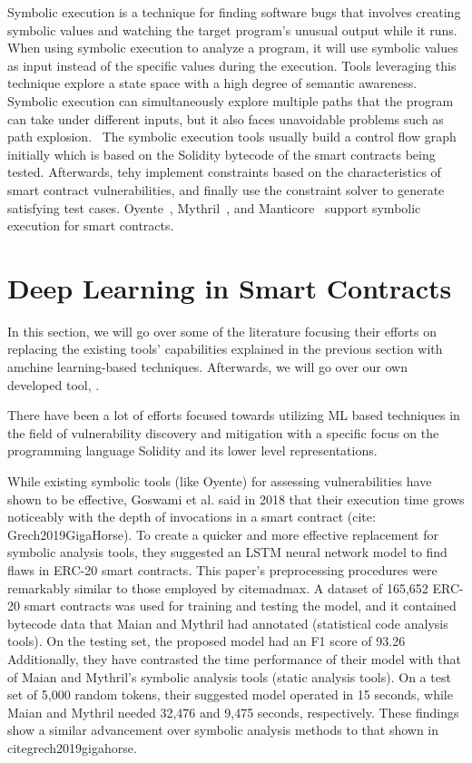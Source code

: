 Symbolic execution is a technique for finding software bugs that involves creating symbolic values and watching the target program's unusual output while it runs.
When using symbolic execution to analyze a program, it will use symbolic values as input instead of the specific values during the execution.
Tools leveraging this technique explore a state space with a high degree of semantic awareness.~\cite{boyer1975select}
Symbolic execution can simultaneously explore multiple paths that the program can take under different inputs, but it also faces unavoidable problems such as path explosion.~\cite{Empirical-Evaluation-of-Smart-Contract-Testing:What-is-the-Best-Choice}
The symbolic execution tools usually build a control flow graph initially which is based on the Solidity bytecode of the smart contracts being tested.
Afterwards, tehy implement constraints based on the characteristics of smart contract vulnerabilities, and finally use the constraint solver to generate satisfying test cases.
Oyente~\cite{oyente}, Mythril~\cite{mythril}, and Manticore~\cite{mossberg2019manticore} support symbolic execution for smart contracts.


\section{Deep Learning in Smart Contracts} \label{sec:dl-models}

In this section, we will go over some of the literature focusing their efforts on replacing the existing tools' capabilities explained in the previous section with amchine learning-based techniques.
Afterwards, we will go over our own developed tool, \slithersimil.

There have been a lot of efforts focused towards utilizing ML based techniques in the field of vulnerability discovery and mitigation with a specific focus on the programming language Solidity and
its lower level representations.

While existing symbolic tools (like Oyente) for assessing vulnerabilities have shown to be effective, Goswami et al. said in 2018 that their execution time grows noticeably with the depth of invocations in a smart contract (cite: Grech2019GigaHorse).
To create a quicker and more effective replacement for symbolic analysis tools, they suggested an LSTM neural network model to find flaws in ERC-20 smart contracts.
This paper's preprocessing procedures were remarkably similar to those employed by citemadmax.
A dataset of 165,652 ERC-20 smart contracts was used for training and testing the model, and it contained bytecode data that Maian and Mythril had annotated (statistical code analysis tools).
On the testing set, the proposed model had an F1 score of 93.26%
Additionally, they have contrasted the time performance of their model with that of Maian and Mythril's symbolic analysis tools (static analysis tools).
On a test set of 5,000 random tokens, their suggested model operated in 15 seconds, while Maian and Mythril needed 32,476 and 9,475 seconds, respectively.
These findings show a similar advancement over symbolic analysis methods to that shown in citegrech2019gigahorse.

